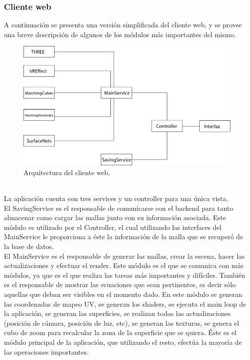 \documentclass[12pt]{article}
\begin{document}
\subsubsection{Cliente web}
A continuación se presenta una versión simplificada del cliente web, y se provee una breve descripción de algunos de los módulos más importantes del mismo.\\
\begin{figure}[h]
\includegraphics[width=\textwidth]{arq_sim.png}
\caption{Arquitectura del cliente web.}
\end{figure}
\\La aplicación cuenta con tres services y un controller para una única vista. 
\\El SavingService es el responsable de comunicarse con el backend para tanto almacenar como cargar las mallas junto con su información asociada. Este módulo es utilizado por el Controller, el cual utilizando las interfaces del MainService le proporciona a éste la información de la malla que se recuperó de la base de datos.
\\El MainService es el responsable de generar las mallas, crear la escena, hacer las actualizaciones y efectuar el render. Este módulo es el que se comunica con más módulos, ya que es el que realiza las tareas más importantes y difíciles. También es el responsable de mostrar las ecuaciones que sean pertinentes, es decir sólo aquellas que deban ser visibles en el momento dado. En este módulo se generan las coordenadas de mapeo UV, se generan los shaders, se ejecuta el main loop de la aplicación, se generan las superficies, se realizan todas las actualizaciones (posición de cámara, posición de luz, etc), se generan las texturas, se genera el cubo de zoom para recalcular la zona de la superficie que se quiera. Éste es el módulo principal de la aplicación, que utilizando el resto, efectúa la mayoría de las operaciones importantes.
\end{document}
